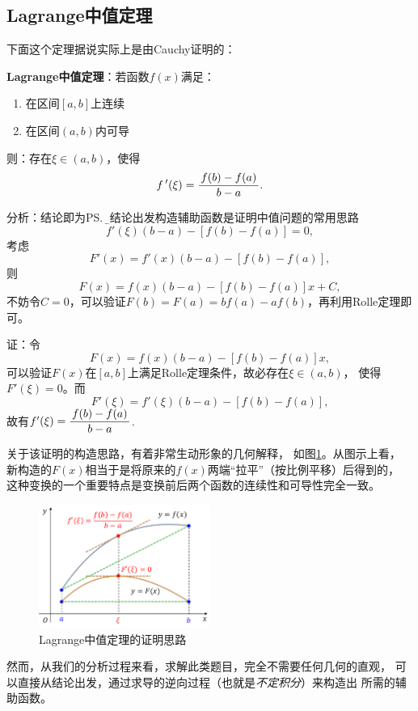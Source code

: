 \subsection{Lagrange中值定理}

下面这个定理据说实际上是由Cauchy证明的：

\begin{thx}
	{\bf Lagrange中值定理}：若函数$f(x)$满足：
	\begin{enumerate}[(1)]
	  \item 在区间$[a,b]$上连续 
	  \item 在区间$(a,b)$内可导 
	\end{enumerate}
	则：存在$\xi\in(a,b)$，使得 
	$$f\,'(\xi)=\displaystyle\frac{\,{f(b)-f(a)}\,}{\,{b-a}\,}.$$
\end{thx}	

分析：结论即为\ps{\b 从结论出发构造辅助函数是证明中值问题的常用思路}
$$f'(\xi)(b-a)-[f(b)-f(a)]=0,$$
考虑
$$F'(x)=f'(x)(b-a)-[f(b)-f(a)],$$
则
$$F(x)=f(x)(b-a)-[f(b)-f(a)]x+C,$$
不妨令$C=0$，可以验证$F(b)=F(a)=bf(a)-af(b)$，再利用Rolle定理即可。

证：令
$$F(x)=f(x)(b-a)-[f(b)-f(a)]x,$$
可以验证$F(x)$在$[a,b]$上满足Rolle定理条件，故必存在$\xi\in(a,b)$，
使得$F'(\xi)=0$。而
$$F'(\xi)=f'(\xi)(b-a)-[f(b)-f(a)],$$
故有$f'(\xi)=\displaystyle\frac{\,{f(b)-f(a)}\,}{\,{b-a}\,}$.\fin

关于该证明的构造思路，有着非常生动形象的几何解释，
如图\ref{fig:LagrangeTh}。从图示上看，
新构造的$F(x)$相当于是将原来的$f(x)$两端“拉平”（按比例平移）后得到的，
这种变换的一个重要特点是变换前后两个函数的连续性和可导性完全一致。

\begin{figure}[h]
	\centering
	\includegraphics[width=0.5\textwidth]
	{./Images/Ch03/LagrangeTh.pdf}
	\caption{Lagrange中值定理的证明思路}
	\label{fig:LagrangeTh}
\end{figure}

然而，从我们的分析过程来看，求解此类题目，完全不需要任何几何的直观，
可以直接从结论出发，通过求导的逆向过程（也就是{\it 不定积分}）来构造出
所需的辅助函数。

